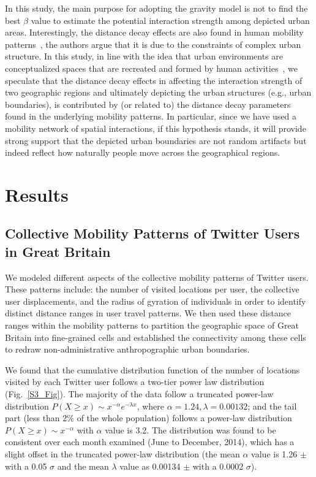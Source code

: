 \documentclass[]{tGIS2e}
\begin{document}
In this study, the main purpose for adopting the gravity model is not to find the best $\beta$ value to estimate the potential interaction strength among depicted urban areas.
Interestingly, the distance decay effects are also found in human mobility patterns~\citep{zhao2016}, the authors argue that it is due to the constraints of complex urban structure.
In this study, in line with the idea that urban environments are conceptualized spaces that are recreated and formed by human activities~\citep{schliephake}, we speculate that the distance decay effects in affecting the interaction strength of two geographic regions and ultimately depicting the urban structures (e.g., urban boundaries), is contributed by (or related to) the distance decay parameters found in the underlying mobility patterns. 
In particular, since we have used a mobility network of spatial interactions, if this hypothesis stands, it will provide strong support that the depicted urban boundaries are not random artifacts but indeed reflect how naturally people move across the geographical regions. 

\section{Results}
\subsection{Collective Mobility Patterns of Twitter Users in Great Britain}
We modeled different aspects of the collective mobility patterns of Twitter users.
These patterns include: the number of visited locations per user,  the collective user displacements, and the radius of gyration of individuals in order to identify distinct distance ranges in user travel patterns.
We then used these distance ranges within the mobility patterns to partition the geographic space of Great Britain into fine-grained cells and established the connectivity among these cells to redraw non-administrative anthropographic urban boundaries. 

We found that the cumulative distribution function of the number of locations visited by each Twitter user follows a two-tier power law distribution (Fig.~\ref{S3_Fig}). 
The majority of the data follow a truncated power-law distribution $P(X\geq x)\sim x^{-\alpha}e^{-\lambda x}$, where $\alpha = 1.24, \lambda =0.00132$; and the tail part (less than 2$\%$ of the whole population) follows a power-law distribution  $P(X \geq x)\sim x^{-\alpha}$ with $\alpha$ value is 3.2.
The distribution was found to be consistent over each month examined (June to December, 2014), which has a slight offset in the truncated power-law distribution (the mean $\alpha$ value is 1.26 $ \pm$ with a 0.05 $\sigma$ and the mean $\lambda$ value as 0.00134 $ \pm$  with a 0.0002 $\sigma$). 
\end{document}
